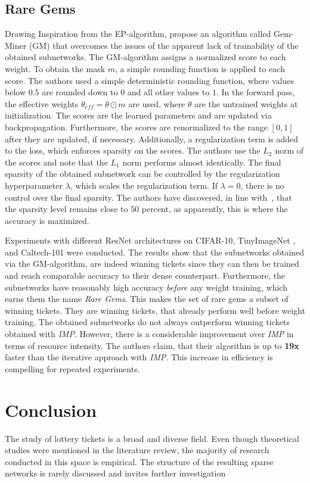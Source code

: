 \subsection{Rare Gems}
Drawing Inspiration from the EP-algorithm, \textcite{RareGems} propose an algorithm called Gem-Miner (GM) that overcomes the issues of the apparent lack of trainability of the obtained subnetworks.
The {GM}-algorithm assigns a normalized score to each weight. 
To obtain the mask $m$, a simple rounding function is applied to each score. The authors used a simple deterministic rounding function, where values below $0.5$ are rounded down to $0$ and all other values to $1$.
In the forward pass, the effective weights $\theta_{eff} = \theta \odot m$ are used, where $\theta$ are the untrained weights at initialization. 
The scores are the learned parameters and are updated via backpropagation.
Furthermore, the scores are renormalized to the range $[0,1]$ after they are updated, if necessary.
Additionally, a regularization term is added to the loss, which enforces sparsity on the scores. 
The authors use the $L_2$ norm of the scores and note that the $L_1$ norm performs almost identically.
The final sparsity of the obtained subnetwork can be controlled by the regularization hyperparameter $\lambda$, which scales the regularization term.
If $\lambda = 0$, there is no control over the final sparsity. 
The authors have discovered, in line with~\cite{EdgePopup}, that the sparsity level remains close to $50$ percent, as apparently, this is where the accuracy is maximized.

Experiments with different ResNet architectures on CIFAR-10, TinyImageNet \autocite{Tinyimagenet}, and Caltech-101 \autocite{Caltech101} were conducted. 
The results show that the subnetworks obtained via the {GM}-algorithm, are indeed winning tickets since they can then be trained and reach comparable accuracy to their dense counterpart.
Furthermore, the subnetworks have reasonably high accuracy \textit{before} any weight training, which earns them the name \textit{Rare Gems}. 
This makes the set of rare gems a subset of winning tickets. 
They are winning tickets, that already perform well before weight training.
The obtained subnetworks do not always outperform winning tickets obtained with \textit{IMP}. 
However, there is a considerable improvement over \textit{IMP} in terms of resource intensity.
The authors claim, that their algorithm is up to \textbf{19x} faster than the iterative approach with \textit{IMP}. 
This increase in efficiency is compelling for repeated experiments.

\section{Conclusion}
The study of lottery tickets is a broad and diverse field. 
Even though theoretical studies were mentioned in the literature review, the majority of research conducted in this space is empirical.
The structure of the resulting sparse networks is rarely discussed and invites further investigation
